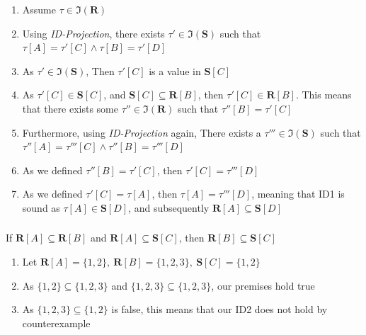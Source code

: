 \documentclass[letterpaper]{article}
\theoremstyle{plain}
\theoremstyle{definition}
\theoremstyle{remark}
\begin{document}
\begin{enumerate}
    \item Assume $\tau\in\mathfrak{I}(\textbf{R})$
    \item Using \textit{ID-Projection}, there exists $\tau'\in\mathfrak{I}(\textbf{S})$ such that $\tau[A]=\tau'[C]\land\tau[B]=\tau'[D]$
    \item As $\tau'\in\mathfrak{I}(\textbf{S})$, Then $\tau'[C]$ is a value in $\textbf{S}[C]$
    \item As $\tau'[C]\in\textbf{S}[C]$, and $\textbf{S}[C]\subseteq\textbf{R}[B]$, then $\tau'[C]\in\textbf{R}[B]$. This means that there exists some $\tau''\in\mathfrak{I}(\textbf{R})$ such that $\tau''[B]=\tau'[C]$
    \item Furthermore, using \textit{ID-Projection} again, There exists a $\tau'''\in\mathfrak{I}(\textbf{S})$ such that $\tau''[A]=\tau'''[C]\land\tau''[B]=\tau'''[D]$
    \item As we defined $\tau''[B]=\tau'[C]$, then $\tau'[C]=\tau'''[D]$
    \item As we defined $\tau'[C]=\tau[A]$, then $\tau[A]=\tau'''[D]$, meaning that ID1 is sound as $\tau[A]\in\textbf{S}[D]$, and subsequently $\textbf{R}[A]\subseteq\textbf{S}[D]$
\end{enumerate}
\subsubsection{}
\begin{center}
    If $\textbf{R}[A]\subseteq\textbf{R}[B]$ and $\textbf{R}[A]\subseteq\textbf{S}[C]$, then $\textbf{R}[B]\subseteq\textbf{S}[C]$
\end{center}
\begin{enumerate}
    \item Let $\textbf{R}[A]=\{1,2\},~\textbf{R}[B]=\{1,2,3\},~\textbf{S}[C]=\{1,2\}$
    \item As $\{1,2\}\subseteq\{1,2,3\}$ and $\{1,2,3\}\subseteq\{1,2,3\}$, our premises hold true
    \item As $\{1,2,3\}\subseteq\{1,2\}$ is false, this means that our ID2 does not hold by counterexample
\end{enumerate}
\end{document}
